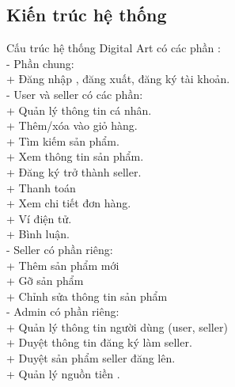 \documentclass{article}
\begin{document}
{{{{{{{{{{{{{{{{{\subsection{Kiến trúc hệ thống }

{
	\large Cấu trúc hệ thống Digital Art có các phần :\\
- Phần chung:\\
+ Đăng nhập , đăng xuất, đăng ký tài khoản.\\
- User và seller có các phần:\\
+ Quản lý thông tin cá nhân.\\
+ Thêm/xóa vào giỏ hàng.\\
+ Tìm kiếm sản phẩm.\\
+ Xem thông tin sản phẩm.\\
+ Đăng ký trở thành seller.\\
+ Thanh toán \\
+ Xem chi tiết đơn hàng.\\
+ Ví điện tử.\\
+ Bình luận.\\
- Seller có phần riêng:\\
+ Thêm sản phẩm mới\\
+ Gỡ sản phẩm\\
+ Chỉnh sửa thông tin sản phẩm\\
- Admin có phần riêng:\\
+ Quản lý thông tin người dùng (user, seller)\\
+ Duyệt thông tin đăng ký làm seller.\\
+ Duyệt sản phẩm seller đăng lên.\\
+ Quản lý nguồn tiền .\\
	
}
\newpage
}}}}}}}}}}}}}}}}}
\end{document}
